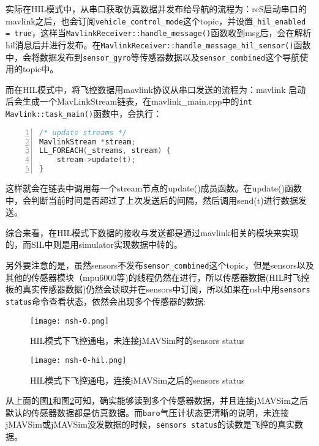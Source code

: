 实际在HIL模式中，从串口获取仿真数据并发布给导航的流程为：rcS启动串口的mavlink之后，也会订阅\texttt{vehicle_control_mode}这个topic，并设置\texttt{_hil_enabled = true}，这样当\texttt{MavlinkReceiver::handle_message()}函数收到msg后，会在解析hil消息后并进行发布。在\texttt{MavlinkReceiver::handle_message_hil_sensor()}函数中，会将数据发布到\texttt{sensor_gyro}等传感器数据以及\texttt{sensor_combined}这个导航使用的topic中。

而在HIL模式中，将飞控数据用mavlink协议从串口发送的流程为：mavlink 启动后会生成一个MavLinkStream链表，在mavlink_main.cpp中的\texttt{int Mavlink::task_main()}函数中，会执行：
\begin{lstlisting}[language=C++,numbers=left,firstnumber = 1,breaklines = true,numberstyle=\tiny,keywordstyle=\color{blue!70},commentstyle=\color{red!50!green!50!blue!50},frame=shadowbox, rulesepcolor=\color{red!20!green!20!blue!20}]
/* update streams */
MavlinkStream *stream;
LL_FOREACH(_streams, stream) {
	stream->update(t);
}
\end{lstlisting}
这样就会在链表中调用每一个stream节点的update()成员函数。在update()函数中，会判断当前时间是否超过了上次发送后的间隔，然后调用send(t)进行数据发送。

综合来看，在HIL模式下数据的接收与发送都是通过mavlink相关的模块来实现的，而SIL中则是用simulator实现数据中转的。

另外要注意的是，虽然sensors不发布\texttt{sensor_combined}这个topic，但是sensors以及其他的传感器模块（mpu6000等)的线程仍然在进行，所以传感器数据(HIL时飞控板的真实传感器数据)仍然会读取并在sensors中订阅，所以如果在nsh中用\texttt{sensors status}命令查看状态，依然会出现多个传感器的数据:
\begin{figure}[htbp]
	\figskip
	\centering
	\texttt{[image: nsh-0.png]}	  
	\caption{\label{fig: sensors0} HIL模式下飞控通电，未连接jMAVSim时的sensors status}
\end{figure}

\begin{figure}[htbp]
	\figskip
	\centering
	\texttt{[image: nsh-0-hil.png]}	  
	\caption{\label{fig: sensors1} HIL模式下飞控通电，连接jMAVSim之后的sensors status}
\end{figure}
从上面的图\ref{fig: sensors0}和图\ref{fig: sensors1}可知，确实能够读到多个传感器数据，并且连接jMAVSim之后默认的传感器数据都是仿真数据。而\texttt{baro}气压计状态更清晰的说明，未连接jMAVSim或jMAVSim没发数据的时候，\texttt{sensors status}的读数是飞控的真实数据。

